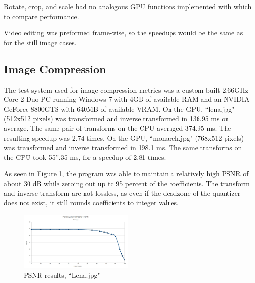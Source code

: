 \documentclass[10pt,twocolumn,twoside]{IEEEtran}
\begin{document}
Rotate, crop, and scale had no analogous GPU functions implemented with which to compare performance. 

Video editing was preformed frame-wise, so the speedups would be the same as for the still image cases.

\subsection{Image Compression}
The test system used for image compression metrics was a custom built 2.66GHz Core 2 Duo PC running Windows 7 with 4GB of available RAM and an NVIDIA GeForce 8800GTS with 640MB of available VRAM. On the GPU, ``lena.jpg" (512x512 pixels) was transformed and inverse transformed in 136.95 ms on average. The same pair of transforms on the CPU averaged 374.95 ms. The resulting speedup was 2.74 times. On the GPU, ``monarch.jpg" (768x512 pixels) was transformed and inverse transformed in 198.1 ms. The same transforms on the CPU took 557.35 ms, for a speedup of 2.81 times.

As seen in Figure \ref{fig:lena_psnr}, the program was able to maintain a relatively high PSNR of about 30 dB while zeroing out up to 95 percent of the coefficients. The transform and inverse transform are not lossless, as even if the deadzone of the quantizer does not exist, it still rounds coefficients to integer values.

\begin{figure}[htbp]
\begin{center}
\includegraphics[width=0.5\textwidth]{Images/lena_psnr_chart.jpg}
\caption{PSNR results, ``Lena.jpg"}
\label{fig:lena_psnr}
\end{center}
\end{figure}

\end{document}
